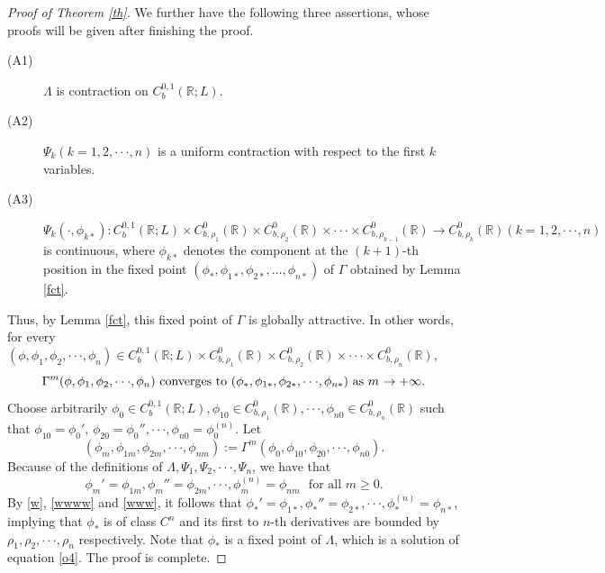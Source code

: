 \documentclass[11pt,reqno,a4paper]{amsart}
\numberwithin{equation}{section}
\begin{document}
\begin{proof}[Proof of Theorem \ref{th}]
We further have the following three assertions, whose proofs will be given after finishing the proof.
\begin{description}
    \item[(A1)] \label{a1} $\Lambda$ is contraction on $C_{b}^{0,1}(\mathbb{R};L).$ 
    \item[(A2)] $\Psi_k(k=1,2,\cdot\cdot \cdot,n)$ is a uniform contraction with respect to the first $k$ variables.
    \item[(A3)]  $\Psi_k(\cdot, \phi_{k\ast}):  C_{b}^{0,1}(\mathbb{R};L)\times  C_{b,\rho_1}^0(\mathbb{R}) \times  C_{b,\rho_2}^0(\mathbb{R})\times\cdot\cdot \cdot\times C_{b,\rho_{k-1}}^0(\mathbb{R}) \rightarrow C_{b,\rho_{k}}^0(\mathbb{R})(k=1,2,\cdot\cdot \cdot,n)$ is continuous, where $\phi_{k\ast}$ denotes the component at the 
$(k+1)$-th position in the fixed point $(\phi_{\ast}, \phi_{1\ast}, \phi_{2\ast}, \dots, \phi_{n\ast})$ of $\Gamma$ obtained by Lemma \ref{fct}.
\end{description}
Thus, by Lemma \ref{fct}, this fixed point of $\Gamma$ is globally attractive. In other words, for every $(\phi,\phi_{1},\phi_{2},\cdot\cdot \cdot,\phi_{n}) \in C_{b}^{0,1}(\mathbb{R};L) \times C_{b,\rho_1}^0(\mathbb{R}) \times C_{b,\rho_2}^0(\mathbb{R})\times\cdot\cdot \cdot\times C_{b,\rho_n}^0(\mathbb{R}),$ 
\begin{equation}\label{w}
    \text{ $ \Gamma^{m}(\phi,\phi_{1},\phi_{2},\cdot\cdot \cdot,\phi_{n})$ converges to $(\phi_{\ast},\phi_{1\ast},\phi_{2\ast},\cdot\cdot \cdot,\phi_{n\ast})$ as $m$ $\rightarrow +\infty.$ } 
\end{equation}
Choose arbitrarily $\phi_{0} \in C_{b}^{0,1}(\mathbb{R};L),\phi_{10} \in C_{b,\rho_1}^0(\mathbb{R}),\cdot\cdot \cdot,\phi_{n0} \in C_{b,\rho_n}^0(\mathbb{R})$ such that $\phi_{10}=\phi_{0}'$, $\phi_{20}=\phi_{0}'',\cdot\cdot \cdot,\phi_{n0}=\phi_{0}^{(n)}.$
 Let 
\begin{equation}\label{wwww}
    (\phi_{m},\phi_{1m},\phi_{2m},\cdot\cdot \cdot,\phi_{nm}):=\Gamma^{m}(\phi_{0},\phi_{10},\phi_{20},\cdot\cdot \cdot,\phi_{n0}).
\end{equation}
Because of the definitions of $\Lambda,\Psi_1, \Psi_2,\cdot\cdot \cdot,\Psi_n$, we have that 
\begin{equation}\label{www}
    \phi_{m}'=\phi_{1m},\phi_{m}''=\phi_{2m},\cdot\cdot \cdot,\phi_{m}^{(n)}=\phi_{nm}  \text{  ~for all } m \geq 0. 
\end{equation}
By \eqref{w}, \eqref{wwww} and \eqref{www}, it follows that $\phi_{\ast}'=\phi_{1\ast}, \phi_{\ast}''=\phi_{2\ast},\cdot\cdot \cdot,\phi_{\ast}^{(n)}=\phi_{n\ast}$, implying that $\phi_{\ast}$ is of class $C^{n}$ and its first to $n$-th derivatives are bounded by $\rho_1, \rho_2,\cdot\cdot \cdot,\rho_n$ respectively.
Note that $\phi_{\ast}$ is a fixed point of $\Lambda$, which is a solution of equation  \eqref{o4}. The proof is complete.
\end{proof}
\end{document}

